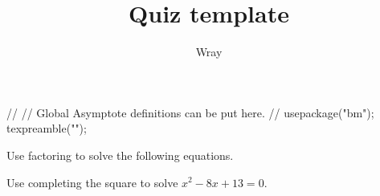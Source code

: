 \documentclass[addpoints, 12pt]{exam}
\title{Quiz template}
\author{Wray}
\begin{document}
\begin{asydef}
//
// Global Asymptote definitions can be put here.
//
usepackage("bm");
texpreamble("\def\V#1{\bm{#1}}");
\end{asydef}



\bigskip

             
\bigskip
\bigskip

\smallskip

\begin{questions}

\question
Use factoring to solve the following equations.
\newpage 

\question[8]
Use completing the square to solve $x^2 - 8x + 13 = 0$.


\end{questions}
\end{document}
